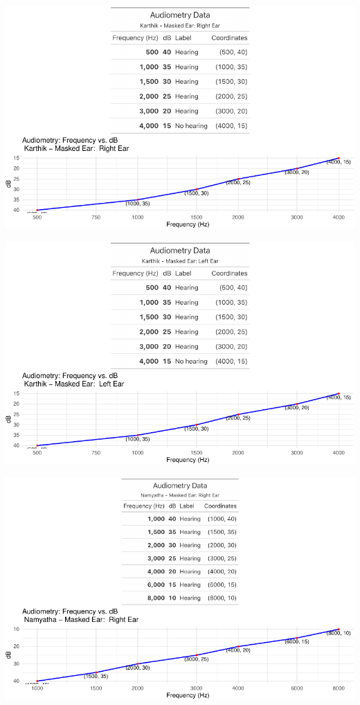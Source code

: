 \documentclass[
  11pt,
  letterpaper,
  DIV=11,
  numbers=noendperiod]{scrreprt}
\begin{document}
\includegraphics{audiometry_files/figure-pdf/unnamed-chunk-5-1.pdf}

\includegraphics{audiometry_files/figure-pdf/unnamed-chunk-6-1.pdf}

\includegraphics{audiometry_files/figure-pdf/unnamed-chunk-7-1.pdf}
\end{document}
